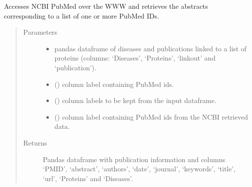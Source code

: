 \documentclass[letterpaper,10pt,english]{sphinxmanual}
\begin{document}

\begin{fulllineitems}
\label{\detokenize{_autosummary/analytics_core.analytics:analytics_core.analytics.analytics.get_publications_abstracts}}
Accesses NCBI PubMed over the WWW and retrieves the abstracts corresponding to a list of one or more PubMed IDs.
\begin{quote}\begin{description}
\item[{Parameters}] \leavevmode\begin{itemize}
\item {} 
 \textendash{} pandas dataframe of diseases and publications linked to a list of proteins (columns: ‘Diseases’, ‘Proteins’, ‘linkout’ and ‘publication’).

\item {} 
 () \textendash{} column label containing PubMed ids.

\item {} 
 () \textendash{} column labels to be kept from the input dataframe.

\item {} 
 () \textendash{} column label containing PubMed ids from the NCBI retrieved data.

\end{itemize}

\item[{Returns}] \leavevmode
Pandas dataframe with publication information and columns ‘PMID’, ‘abstract’, ‘authors’, ‘date’, ‘journal’, ‘keywords’, ‘title’, ‘url’, ‘Proteins’ and ‘Diseases’.


\end{description}
\end{quote}
\end{fulllineitems}
\end{document}
